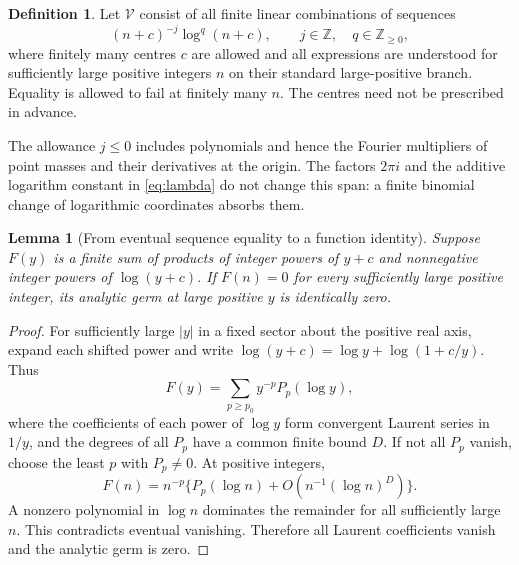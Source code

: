 \documentclass[11pt,a4paper]{article}
\numberwithin{equation}{section}
\newtheorem{lemma}[theorem]{Lemma}
\theoremstyle{definition}\newtheorem{definition}[theorem]{Definition}
\theoremstyle{remark}\newtheorem{remark}[theorem]{Remark}
\newcommand{\Z}{\mathbb Z}\newcommand{\N}{\mathbb N}\newcommand{\C}{\mathbb C}
\begin{document}
\begin{definition}
Let $\mathcal V$ consist of all finite linear combinations of sequences
\begin{equation}
 (n+c)^{-j}\log^q(n+c),\qquad j\in\Z,\quad q\in\Z_{\ge0},
 \label{eq:span}
\end{equation}
where finitely many centres $c$ are allowed and all expressions are
understood for sufficiently large positive integers $n$ on their
standard large-positive branch. Equality is allowed to fail at finitely
many $n$. The centres need not be prescribed in advance.
\end{definition}
The allowance $j\le0$ includes polynomials and hence the Fourier
multipliers of point masses and their derivatives at the origin.
The factors $2\pi i$ and the additive logarithm constant in
\eqref{eq:lambda} do not change this span: a finite binomial change of
logarithmic coordinates absorbs them.

\begin{lemma}[From eventual sequence equality to a function identity]
\label{lem:sequence}
Suppose $F(y)$ is a finite sum of products of integer powers of $y+c$
and nonnegative integer powers of $\log(y+c)$. If $F(n)=0$ for every
sufficiently large positive integer, its analytic germ at large positive
$y$ is identically zero.
\end{lemma}
\begin{proof}
For sufficiently large $|y|$ in a fixed sector about the positive real
axis, expand each shifted power and write
$\log(y+c)=\log y+\log(1+c/y)$. Thus
\[
 F(y)=\sum_{p\ge p_0}y^{-p}P_p(\log y),
\]
where the coefficients of each power of $\log y$ form convergent
Laurent series in $1/y$, and the degrees of all $P_p$ have a common
finite bound $D$. If not all $P_p$ vanish, choose the least $p$ with
$P_p\ne0$. At positive integers,
\[
 F(n)=n^{-p}\{P_p(\log n)+O(n^{-1}(\log n)^D)\}.
\]
A nonzero polynomial in $\log n$ dominates the remainder for all
sufficiently large $n$. This contradicts eventual vanishing. Therefore
all Laurent coefficients vanish and the analytic germ is zero.
\end{proof}
\end{document}
